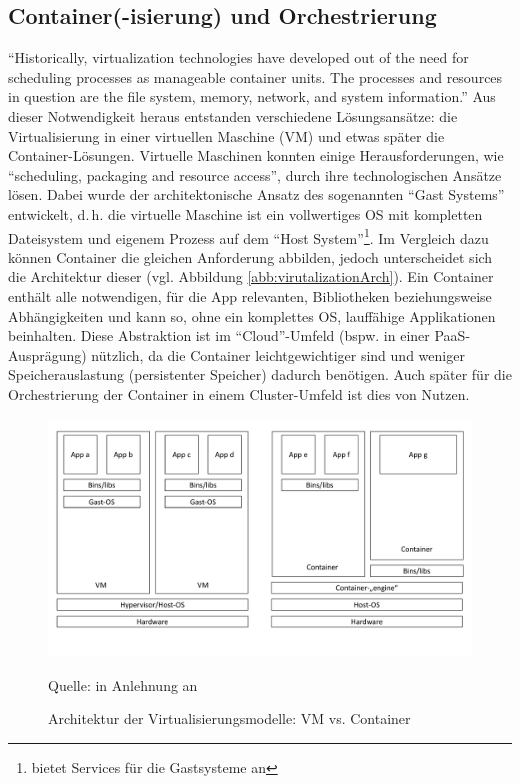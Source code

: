 \subsection{Container(-isierung) und Orchestrierung}\label{kap:container}
\enquote{Historically, virtualization technologies have developed out of the need for scheduling processes as manageable container units. The processes and resources in question are the file system, memory, network, and system information.}\autocite[][S.\,25]{pahl_containerization_2015} Aus dieser Notwendigkeit heraus entstanden verschiedene Lösungsansätze: die Virtualisierung in einer virtuellen Maschine (\ac{VM}) und etwas später die Container-Lösungen. Virtuelle Maschinen konnten einige Herausforderungen, wie \enquote{scheduling, packaging and resource access}, durch ihre technologischen Ansätze lösen. Dabei wurde der architektonische Ansatz des sogenannten \enquote{Gast Systems} entwickelt, d.\,h. die virtuelle Maschine ist ein vollwertiges \ac{OS} mit kompletten Dateisystem und eigenem Prozess auf dem \enquote{Host System}\footnote{bietet Services für die Gastsysteme an}. Im Vergleich dazu können Container die gleichen Anforderung abbilden, jedoch unterscheidet sich die Architektur dieser (vgl. Abbildung \vref{abb:virutalizationArch}). Ein Container enthält alle notwendigen, für die App relevanten, Bibliotheken beziehungsweise Abhängigkeiten und kann so, ohne ein komplettes \ac{OS}, lauffähige Applikationen beinhalten. Diese Abstraktion ist im \enquote{Cloud}-Umfeld (bspw. in einer \ac{PaaS}-Ausprägung) nützlich, da die Container leichtgewichtiger sind und weniger Speicherauslastung (persistenter Speicher) dadurch benötigen. Auch später für die Orchestrierung der Container in einem Cluster-Umfeld ist dies von Nutzen. 

\begin{figure}[h!]
	\centering
	\includegraphics[scale=0.44]{img/virtualization architecture.pdf}
	\caption{Architektur der Virtualisierungsmodelle: VM vs. Container}
	{\footnotesize Quelle: in Anlehnung an \cite{pahl_containerization_2015}}
	\label{abb:virutalizationArch}
\end{figure}

